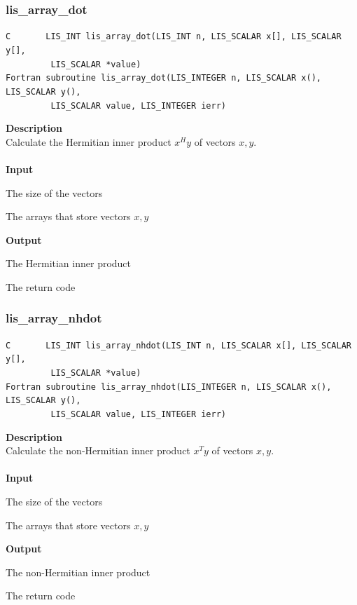 \documentclass[a4paper]{article}
\newcommand{\namelistlabel}[1]{\mbox{#1}\hfill}
\newenvironment{namelist}[1]{%
\begin{list}{}
  {\let\makelabel\namelistlabel
  \settowidth{\labelwidth}{#1}
  \setlength{\leftmargin}{1.1\labelwidth}}
  }{%
\end{list}}
\begin{document}
\subsubsection{lis\_array\_dot}
\begin{screen}
\verb|C       LIS_INT lis_array_dot(LIS_INT n, LIS_SCALAR x[], LIS_SCALAR y[],|\\
\verb|         LIS_SCALAR *value)|\\
\verb|Fortran subroutine lis_array_dot(LIS_INTEGER n, LIS_SCALAR x(), LIS_SCALAR y(),|\\
\verb|         LIS_SCALAR value, LIS_INTEGER ierr)|
\end{screen}
{\bf Description}\\
\indent
Calculate the Hermitian inner product $x^{H}y$ of vectors $x, y$.
\\ \\
\noindent
{\bf Input}
\begin{namelist}{XXXXXXXXXXXXXXXXXXXX}
\item[\tt n] The size of the vectors  
\item[\tt x, y] The arrays that store vectors $x, y$
\end{namelist}
{\bf Output}
\begin{namelist}{XXXXXXXXXXXXXXXXXXXX}
\item[\tt value] The Hermitian inner product
\item[\tt ierr] The return code
\end{namelist}

\newpage
\subsubsection{lis\_array\_nhdot}
\begin{screen}
\verb|C       LIS_INT lis_array_nhdot(LIS_INT n, LIS_SCALAR x[], LIS_SCALAR y[],|\\
\verb|         LIS_SCALAR *value)|\\
\verb|Fortran subroutine lis_array_nhdot(LIS_INTEGER n, LIS_SCALAR x(), LIS_SCALAR y(),|\\
\verb|         LIS_SCALAR value, LIS_INTEGER ierr)|
\end{screen}
{\bf Description}\\
\indent
Calculate the non-Hermitian inner product $x^{T}y$ of vectors $x, y$.
\\ \\
\noindent
{\bf Input}
\begin{namelist}{XXXXXXXXXXXXXXXXXXXX}
\item[\tt n] The size of the vectors  
\item[\tt x, y] The arrays that store vectors $x, y$
\end{namelist}
{\bf Output}
\begin{namelist}{XXXXXXXXXXXXXXXXXXXX}
\item[\tt value] The non-Hermitian inner product
\item[\tt ierr] The return code
\end{namelist}
\end{document}
